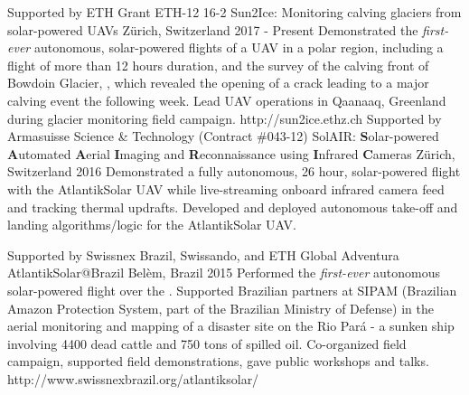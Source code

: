 \label{sec:proj}
\vspace{-5mm}
\begin{cventries}
\begin{multicols}{2}
  \cvprojentry
    {Supported by ETH Grant ETH-12 16-2} %
    {Sun2Ice: Monitoring calving glaciers from solar-powered UAVs} %
    {Z\"{u}rich, Switzerland} %
    {2017 - Present} %
    {Demonstrated the \emph{first-ever} autonomous, solar-powered flights of a UAV in a polar region, including a flight of more than 12 hours duration, and the survey of the calving front of Bowdoin Glacier, , which revealed the opening of a crack leading to a major calving event the following week.} %
    {Lead UAV operations in Qaanaaq, Greenland during glacier monitoring field campaign.} %
	{http://sun2ice.ethz.ch}
  \cvprojentry
    {Supported by Armasuisse Science \& Technology (Contract \#043-12)} %
    {SolAIR: \textbf{S}olar-powered \textbf{A}utomated \textbf{A}erial \textbf{I}maging and \textbf{R}econnaissance using \textbf{I}nfrared \textbf{C}ameras} %
    {Z\"{u}rich, Switzerland} %
    {2016} %
    {Demonstrated a fully autonomous, 26 hour, solar-powered flight with the AtlantikSolar UAV while live-streaming onboard infrared camera feed and tracking thermal updrafts.} %
    {Developed and deployed autonomous take-off and landing algorithms/logic for the AtlantikSolar UAV.} %
	{}
	
  \cvprojentry
    {Supported by Swissnex Brazil, Swissando, and ETH Global} %
    {Adventura AtlantikSolar@Brazil} %
    {Bel\`{e}m, Brazil} %
    {2015} %
    {Performed the \emph{first-ever} autonomous solar-powered flight over the . Supported Brazilian partners at SIPAM (Brazilian Amazon Protection System, part of the Brazilian Ministry of Defense) in the aerial monitoring and mapping of a disaster site on the Rio Pará - a sunken ship involving 4400 dead cattle and 750 tons of spilled oil.} %
    {Co-organized field campaign, supported field demonstrations, gave public workshops and talks.} %
	{http://www.swissnexbrazil.org/atlantiksolar/}
	

\end{multicols}
\end{cventries}
